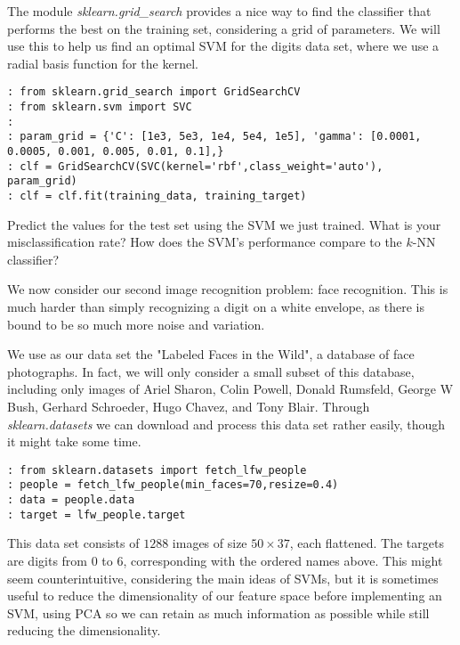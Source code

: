 The module \emph{sklearn.grid\_search} provides a nice way to find the classifier that performs the best on the training set, considering a grid of parameters. We will use this to help us find an optimal SVM for the digits data set, where we use a radial basis function for the kernel.

\begin{lstlisting}[style=python]
: from sklearn.grid_search import GridSearchCV
: from sklearn.svm import SVC
:
: param_grid = {'C': [1e3, 5e3, 1e4, 5e4, 1e5], 'gamma': [0.0001, 0.0005, 0.001, 0.005, 0.01, 0.1],}
: clf = GridSearchCV(SVC(kernel='rbf',class_weight='auto'), param_grid)
: clf = clf.fit(training_data, training_target)
\end{lstlisting}

\begin{problem}
Predict the values for the test set using the SVM we just trained. What is your misclassification rate? How does the SVM's performance compare to the $k$-NN classifier?
\end{problem}

We now consider our second image recognition problem: face recognition. This is much harder than simply recognizing a digit on a white envelope, as there is bound to be so much more noise and variation.

We use as our data set the "Labeled Faces in the Wild", a database of face photographs. In fact, we will only consider a small subset of this database, including only images of Ariel Sharon, Colin Powell, Donald Rumsfeld, George W Bush, Gerhard Schroeder, Hugo Chavez, and Tony Blair. Through \emph{sklearn.datasets} we can download and process this data set rather easily, though it might take some time.

\begin{lstlisting}[style=python]
: from sklearn.datasets import fetch_lfw_people
: people = fetch_lfw_people(min_faces=70,resize=0.4)
: data = people.data
: target = lfw_people.target
\end{lstlisting}

This data set consists of $1288$ images of size $50 \times 37$, each flattened. The targets are digits from $0$ to $6$, corresponding with the ordered names above. This might seem counterintuitive, considering the main ideas of SVMs, but it is sometimes useful to reduce the dimensionality of our feature space before implementing an SVM, using PCA so we can retain as much information as possible while still reducing the dimensionality.

